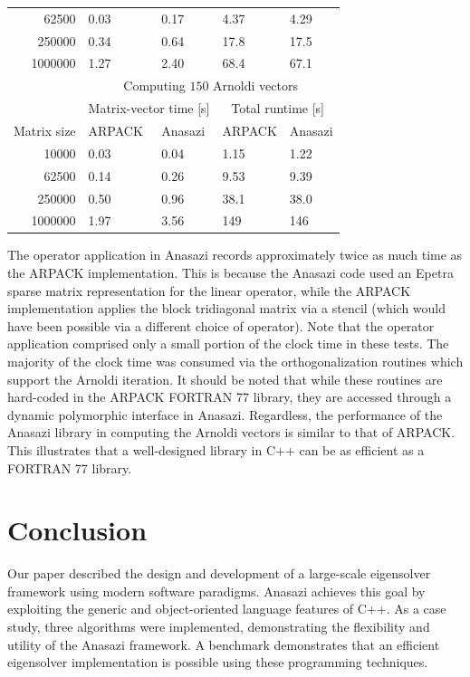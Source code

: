 \documentclass[acmtoms,acmnow]{acmtrans2m}
\begin{document}
\begin{table}
\begin{center}
\begin{tabular}{r|ll|ll|}
       62500 & 0.03 & 0.17 & 4.37 & 4.29 \\
       250000 & 0.34 & 0.64 & 17.8 & 17.5 \\
       1000000 & 1.27 & 2.40 & 68.4 & 67.1 \\
       \hline
        & \multicolumn{4}{c|}{Computing $150$ Arnoldi vectors} \\ \cline{2-5}
        & \multicolumn{2}{c|}{Matrix-vector time [s]} &
       \multicolumn{2}{c|}{Total runtime [s]}\\ \hline
       Matrix size & ARPACK & Anasazi & ARPACK & Anasazi \\ \hline %
       10000 & 0.03 & 0.04 & 1.15 & 1.22 \\
       62500 & 0.14 & 0.26 & 9.53 & 9.39 \\
       250000 & 0.50 & 0.96 & 38.1 & 38.0 \\
       1000000 & 1.97 & 3.56 & 149 & 146 \\
       \hline
     \end{tabular}
\end{center}
\end{table}

The operator application in Anasazi records approximately twice as much time as the ARPACK
implementation. This is because the Anasazi code used an Epetra sparse matrix
representation for the linear operator, while the ARPACK implementation applies the block
tridiagonal matrix via a stencil (which would have been possible via a different choice of
operator). Note that the operator application comprised only a small portion of the clock
time in these tests. The majority of the clock time was consumed via the orthogonalization
routines which support the Arnoldi iteration. It should be noted that while these routines
are hard-coded in the ARPACK FORTRAN 77 library, they are accessed through a dynamic
polymorphic interface in Anasazi. Regardless, the performance of the Anasazi library in
computing the Arnoldi vectors is similar to that of ARPACK. This illustrates that a
well-designed library in C++ can be as efficient as a FORTRAN 77 library.

\section{Conclusion}

Our paper described the design and development of a large-scale eigensolver framework
using modern software paradigms. Anasazi achieves this goal by exploiting the generic and
object-oriented language features of C++. As a case study, three algorithms were
implemented, demonstrating the flexibility and utility of the Anasazi framework. A
benchmark demonstrates that an efficient eigensolver implementation is possible using
these programming techniques. 
\end{document}
